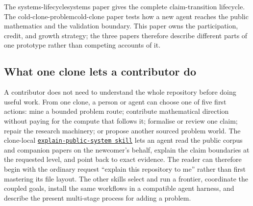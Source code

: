 \documentclass[10pt]{article}
\newcommand{\repobase}{https://github.com/wcook04/plectis-lean-erdos249-257}
\newcommand{\repolink}[2]{\href{\repobase/blob/ca0e13f8acf5ccf48506e4bdb870953d3a0856fa/#1}{\texttt{#2}}}
\begin{document}
The %
{systems-lifecycle}{systems paper} gives the complete claim-transition
lifecycle. The %
{cold-clone-problem}{cold-clone paper} tests how a new agent reaches the public
mathematics and the validation boundary. This paper owns the participation,
credit, and growth strategy; the three papers therefore describe different
parts of one prototype rather than competing accounts of it.

\subsection*{What one clone lets a contributor do}

A contributor does not need to understand the whole repository before doing
useful work.  From one clone, a person or agent can choose one of five first
actions: mine a bounded problem route; contribute mathematical direction
without paying for the compute that follows it; formalise or review one claim;
repair the research machinery; or propose another sourced problem world.  The
clone-local \repolink{skills/explain-public-system/SKILL.md}%
{explain-public-system skill} lets an agent read the public corpus and companion
papers on the newcomer's behalf, explain the claim boundaries at the requested
level, and point back to exact evidence.  The reader can therefore begin with
the ordinary request ``explain this repository to me'' rather than first
mastering its file layout.  The other skills select and run a frontier,
coordinate the coupled goals, install the same workflows in a compatible agent
harness, and describe the present multi-stage process for adding a problem.
\end{document}
